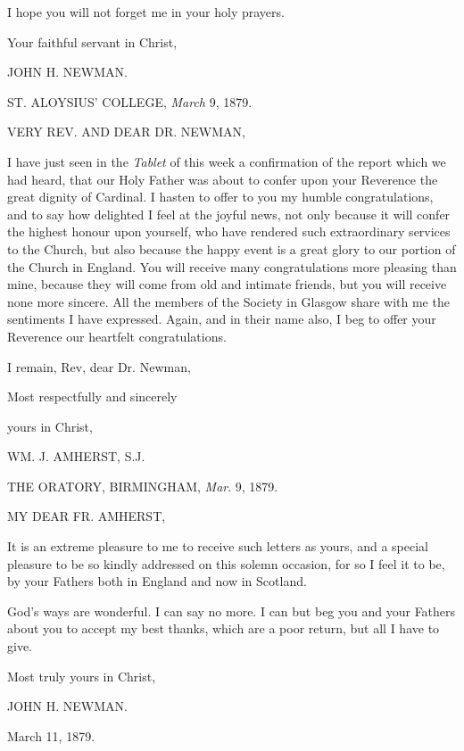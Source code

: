 I hope you will not forget me in your holy prayers.

Your faithful servant in Christ,

JOHN H. NEWMAN.


ST. ALOYSIUS' COLLEGE,
\emph{March} 9, 1879.

VERY REV. AND
DEAR DR. NEWMAN,

I have just seen in the \emph{Tablet} of this week a confirmation of
the report which we had heard, that our Holy Father was about to
confer upon your Reverence the great dignity of Cardinal. I hasten to
offer to you my humble congratulations, and to say how delighted I
feel at the joyful news, not only because it will confer the highest
honour upon yourself, who have rendered such extraordinary services to
the Church, but also because the happy event is a great glory to our
portion of the Church in England. You will receive many
congratulations more pleasing than mine, because they will come
from old and intimate friends, but you will receive none more sincere.
All the members of the Society in Glasgow share with me the sentiments
I have expressed. Again, and in their name also, I beg to offer your
Reverence our heartfelt congratulations.

I remain, Rev, dear Dr. Newman,

Most respectfully and sincerely

yours in Christ,

WM. J. AMHERST, S.J.


THE ORATORY, BIRMINGHAM,
\emph{Mar}. 9, 1879.

MY DEAR FR.
AMHERST,

It is an extreme pleasure to me to receive such letters as yours, and
a special pleasure to be so kindly addressed on this solemn occasion,
for so I feel it to be, by your Fathers both in England and now in
Scotland.

God's ways are wonderful. I can say no more. I can but beg you and
your Fathers about you to accept my best thanks, which are a poor
return, but all I have to give.

Most truly yours in Christ,

JOHN H. NEWMAN.


March 11, 1879.

